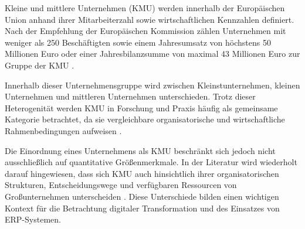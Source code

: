 

Kleine und mittlere Unternehmen (KMU) werden innerhalb der Europäischen Union anhand ihrer 
Mitarbeiterzahl sowie wirtschaftlichen Kennzahlen definiert. Nach der Empfehlung der 
Europäischen Kommission zählen Unternehmen mit weniger als 250 Beschäftigten sowie 
einem Jahresumsatz von höchstens 50 Millionen Euro oder einer Jahresbilanzsumme von 
maximal 43 Millionen Euro zur Gruppe der KMU \parencite{Alaskari2021}.

Innerhalb dieser Unternehmensgruppe wird zwischen Kleinstunternehmen, kleinen 
Unternehmen und mittleren Unternehmen unterschieden. Trotz dieser Heterogenität 
werden KMU in Forschung und Praxis häufig als gemeinsame Kategorie betrachtet, da 
sie vergleichbare organisatorische und wirtschaftliche Rahmenbedingungen aufweisen \parencite{Leyh2015}.

Die Einordnung eines Unternehmens als KMU beschränkt sich jedoch nicht ausschließlich auf 
quantitative Größenmerkmale. In der Literatur wird wiederholt darauf hingewiesen, dass sich 
KMU auch hinsichtlich ihrer organisatorischen Strukturen, Entscheidungswege und verfügbaren 
Ressourcen von Großunternehmen unterscheiden \parencite{Leyh2019,Leyh2015}. Diese Unterschiede bilden einen wichtigen 
Kontext für die Betrachtung digitaler Transformation und des Einsatzes von ERP-Systemen.
